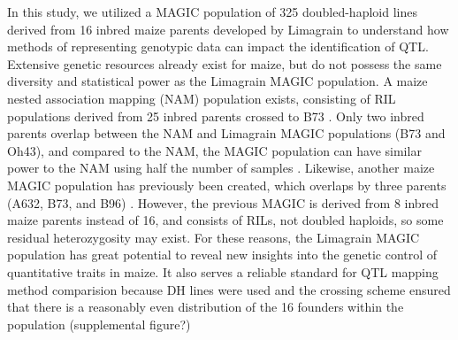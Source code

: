 \documentclass[article,9pt,twocolumn,twoside]{rilabRxiv}
\begin{document}
In this study, we utilized a MAGIC population of 325 doubled-haploid lines derived from 16 inbred maize parents developed by Limagrain to understand how methods of representing genotypic data can impact the identification of QTL. Extensive genetic resources already exist for maize, but do not possess the same diversity and statistical power as the Limagrain MAGIC population. A maize nested association mapping (NAM) population exists, consisting of RIL populations derived from 25 inbred parents crossed to B73 \citep{RN11}.  Only two inbred parents overlap between the NAM and Limagrain MAGIC populations (B73 and Oh43), and compared to the NAM, the MAGIC population can have similar power to the NAM using half the number of samples \citep{RN4}. Likewise, another maize MAGIC population has previously been created, which overlaps by three parents (A632, B73, and B96) \citep{RN4}. However, the previous MAGIC is derived from 8 inbred maize parents instead of 16, and consists of RILs, not doubled haploids, so some residual heterozygosity may exist.  For these reasons, the Limagrain MAGIC population has great potential to reveal new insights into the genetic control of quantitative traits in maize. It also serves a reliable standard for QTL mapping method comparision because DH lines were used and the crossing scheme ensured that there is a reasonably even distribution of the 16 founders within the population (supplemental figure?)
\end{document}
